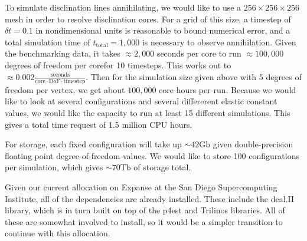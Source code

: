 \documentclass[reqno]{article}
\begin{document}
To simulate disclination lines annihilating, we would like to use a $256\times 256\times 256$ mesh in order to resolve disclination cores.
For a grid of this size, a timestep of $\delta t = 0.1$ in nondimensional units is reasonable to bound numerical error, and a total simulation time of $t_\text{total} = 1,000$ is necessary to observe annihilation.
Given the benchmarking data, it takes $\approx 2,000$ seconds per core to run $\approx 100,000$ degrees of freedom per corefor 10 timesteps.
This works out to $\approx 0.002 \frac{\text{seconds}}{\text{core}\cdot \text{DoF} \cdot \text{timestep}}$.
Then for the simulation size given above with 5 degrees of freedom per vertex, we get about $100,000$ core hours per run.
Because we would like to look at several configurations and several differerent elastic constant values, we would like the capacity to run at least 15 different simulations.
This gives a total time request of 1.5 million CPU hours.

For storage, each fixed configuration will take up $\sim 42 \text{Gb}$ given double-precision floating point degree-of-freedom values.
We would like to store 100 configurations per simulation, which gives $\sim 70 \text{Tb}$ of storage total. 

Given our current allocation on Expanse at the San Diego Supercomputing Institute, all of the dependencies are already installed. 
These include the deal.II library, which is in turn built on top of the p4est and Trilinos libraries. 
All of these are somewhat involved to install, so it would be a simpler transition to continue with this allocation. 

{}

% 
% 
% 
\end{document}
